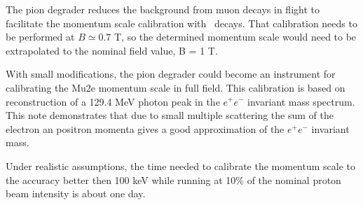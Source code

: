 \documentclass[12pt]{article}
\begin{document}
The pion degrader reduces the background from muon decays in flight to facilitate
the momentum scale calibration with \piplusenu\ decays. That calibration needs to
be performed at $B \simeq 0.7$ T, so the determined momentum scale would need to be
extrapolated to the nominal field value, B = 1 T.

With small modifications, the pion degrader could become an instrument
for calibrating the Mu2e momentum scale in full field. This calibration is based on
reconstruction of a 129.4 MeV photon peak in the $e^+e^-$ invariant mass spectrum.
%
This note demonstrates that due to small multiple scattering the sum of the
electron an positron momenta gives a good approximation of the $e^+e^-$ invariant mass.

Under realistic assumptions, the time needed to calibrate the momentum scale
to the accuracy better then 100 keV while running at 10\% of the nominal proton beam
intensity is about one day.


%
\newpage



% 

\end{document}
